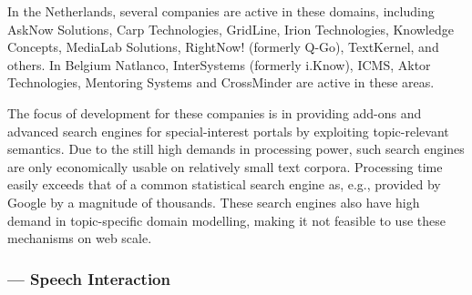 \documentclass{scrartcl}
\begin{document}
\begin{Parallel}[c]{70mm}{70mm}
{    In the Netherlands, several companies are active in these domains, including AskNow Solutions, Carp Technologies, GridLine, Irion Technologies, Knowledge Concepts, MediaLab Solutions, RightNow! (formerly Q-Go), TextKernel, and others. In Belgium Natlanco, InterSystems (formerly i.Know), ICMS, Aktor Technologies, Mentoring Systems and CrossMinder are active in these areas.

    The focus of development for these companies is in providing add-ons and advanced search engines for special-interest portals by exploiting topic-relevant semantics. Due to the still high demands in processing power, such search engines are only economically usable on relatively small text corpora. Processing time easily exceeds that of a common statistical search engine as, e.g., provided by Google by a magnitude of thousands. These search engines also have high demand in topic-specific domain modelling, making it not feasible to use these mechanisms on web scale.

  }

  \ParallelPar


  \subsubsection{ --- Speech Interaction}

  \MyParallelLText{
  

  }

\end{Parallel}
\end{document}
